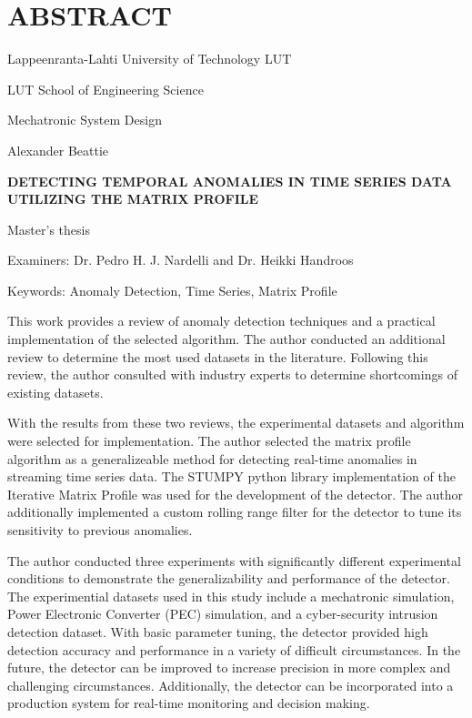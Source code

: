 \section*{\MakeUppercase{Abstract}}
{}%
\thispagestyle{empty}
\begin{singlespace} 
{
Lappeenranta-Lahti University of Technology LUT \bigskip

\parskip=0pt %

LUT School of Engineering Science \bigskip

Mechatronic System Design \bigskip

Alexander Beattie \bigskip \bigskip

\textbf{\MakeUppercase{Detecting Temporal Anomalies in Time Series Data}} \\
\textbf{\MakeUppercase{Utilizing the Matrix Profile}} \bigskip\bigskip

Master's thesis \bigskip

\the\year{} \bigskip

Examiners: Dr. Pedro H. J. Nardelli and Dr. Heikki Handroos \bigskip

Keywords: Anomaly Detection, Time Series, Matrix Profile \bigskip\bigskip
}
This work provides a review of anomaly detection techniques and a practical implementation of the selected algorithm. The author conducted an additional review to determine the most used datasets in the literature. Following this review, the author consulted with industry experts to determine shortcomings of existing datasets.

With the results from these two reviews, the experimental datasets and algorithm were selected for implementation. The author selected the matrix profile algorithm as a generalizeable method for detecting real-time anomalies in streaming time series data. The STUMPY python library implementation of the Iterative Matrix Profile was used for the development of the detector. The author additionally implemented a custom rolling range filter for the detector to tune its sensitivity to previous anomalies. 

The author conducted three experiments with significantly different experimental conditions to demonstrate the generalizability and performance of the detector. The experimential datasets used in this study include a mechatronic simulation, Power Electronic Converter (PEC) simulation, and a cyber-security intrusion detection dataset.  With basic parameter tuning, the detector provided high detection accuracy and performance in a variety of difficult circumstances. In the future, the detector can be improved to increase precision in more complex and challenging circumstances. Additionally, the detector can be incorporated into a production system for real-time monitoring and decision making.
\end{singlespace}